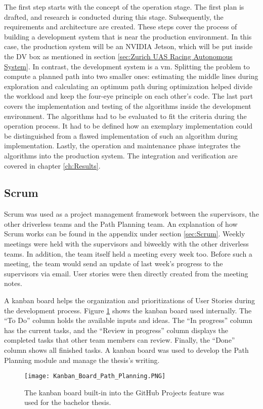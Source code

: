 The first step starts with the concept of the operation stage. The first plan is drafted, and research is conducted during this stage. Subsequently, the requirements and architecture are created. These steps cover the process of building a development system that is near the production environment. In this case, the production system will be an NVIDIA Jetson, which will be put inside the DV box as mentioned in section \ref{sec:Zurich UAS Racing Autonomous System}.
In contrast, the development system is a \acrlong{vm}. Splitting the problem to compute a planned path into two smaller ones: estimating the middle lines during exploration and calculating an optimum path during optimization helped divide the workload and keep the four-eye principle on each other's code. The last part covers the implementation and testing of the algorithms inside the development environment. The algorithms had to be evaluated to fit the criteria during the operation process. It had to be defined how an exemplary implementation could be distinguished from a flawed implementation of such an algorithm during implementation. Lastly, the operation and maintenance phase integrates the algorithms into the production system. The integration and verification are covered in chapter \ref{ch:Results}.

\subsection{Scrum} \label{sec:Planning Method: Scrum}
Scrum was used as a project management framework between the supervisors, the other driverless teams and the Path Planning team. An explanation of how Scrum works can be found in the appendix under section \ref{sec:Scrum}. Weekly meetings were held with the supervisors and biweekly with the other driverless teams. In addition, the team itself held a meeting every week too. Before such a meeting, the team would send an update of last week's progress to the supervisors via email. User stories were then directly created from the meeting notes.

A kanban board helps the organization and prioritizations of User Stories during the development process. Figure \ref{fig:Kanban Board Path Planning} shows the kanban board used internally. The ``To Do'' column holds the available inputs and ideas. The ``In progress'' column has the current tasks, and the ``Review in progress'' column displays the completed tasks that other team members can review. Finally, the ``Done'' column shows all finished tasks. A kanban board was used to develop the Path Planning module and manage the thesis's writing.
\begin{figure}[H]
    \centering
    \texttt{[image: Kanban\_Board\_Path\_Planning.PNG]}
    \caption{The kanban board built-in into the GitHub Projects feature was used for the bachelor thesis.}
    \label{fig:Kanban Board Path Planning}
\end{figure}

